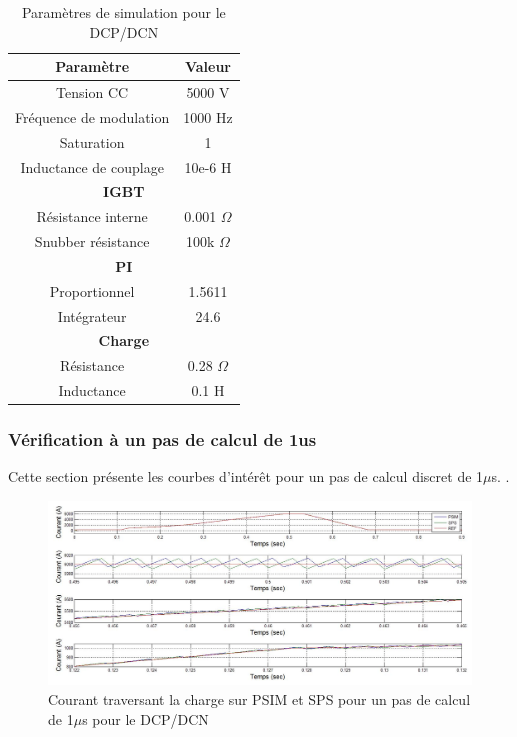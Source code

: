 \documentclass[11pt,letterpaper,final]{report}
\begin{document}
\begin{table}[htb]
\centering
\begin{tabular}{|c|c|} 
  \hline
  \textbf{Paramètre} & \textbf{Valeur}  \\
  \hline\hline
  Tension CC & 5000 V\\ \hline
  Fréquence de modulation & 1000 Hz\\ \hline
  Saturation & 1 \\ \hline
  Inductance de couplage & 10e-6 H \\ \hline \hline
  \multicolumn{2}{|c|}{\textbf{IGBT}}\\ \hline
  Résistance interne & 0.001 $\Omega$\\
  Snubber résistance & 100k $\Omega$\\ \hline \hline
   \multicolumn{2}{|c|}{\textbf{PI}}\\ \hline
  Proportionnel & 1.5611 \\
  Intégrateur & 24.6 \\ \hline \hline
  \multicolumn{2}{|c|}{\textbf{Charge}}\\ \hline
  Résistance & 0.28 $\Omega$\\
  Inductance & 0.1 H \\
  \hline
\end{tabular}
\caption{Paramètres de simulation pour le DCP/DCN}
\label{p_DCP}
\end{table}


\subsubsection{Vérification à un pas de calcul de 1us}
Cette section présente les courbes d'intérêt pour un pas de calcul discret de 1$\mu$s. .



\begin{figure}[htb]
\centering
\includegraphics[scale=0.5]{Fig/DCPDCN/DCPCourantCharge1u.jpg}
\caption{Courant traversant la charge sur PSIM et SPS pour un pas de calcul de 1$\mu$s pour le DCP/DCN}
\label{DC_ch_cou_1}
\end{figure}
\end{document}
